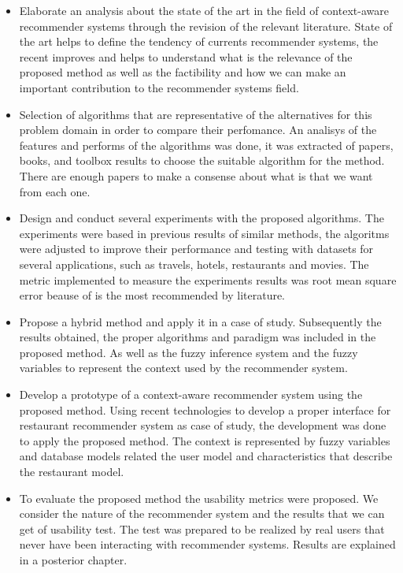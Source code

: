 \begin{itemize}  
\item Elaborate an analysis about the state of the art in the field
of context-aware recommender systems through  the revision of 
the relevant literature. State of the art helps to define the tendency
of currents recommender systems, the recent improves and helps to understand
what is the relevance of the proposed method as well as the factibility and 
how we can make an important contribution to the recommender systems field.
\item Selection of algorithms that are representative of the alternatives for
this problem domain in order to compare their perfomance. An analisys of the 
features and performs of the algorithms was done, it was extracted of papers,
books, and toolbox results to choose the suitable algorithm
for the method. There are enough papers to make a consense about 
what is that we want from each one. 
\item Design and conduct several experiments with the proposed 
algorithms. The experiments were based in previous results of similar 
methods, the algoritms were adjusted to improve their performance and 
testing with datasets for several applications, such as travels, hotels, 
restaurants and movies. The  metric implemented to measure the experiments 
results was root mean square error beause of is the most recommended 
by literature.
\item Propose a hybrid method and apply it in a case of study. 
Subsequently the results obtained, the proper algorithms and paradigm was 
included in the proposed method. As well as the fuzzy inference system and 
the fuzzy variables to represent the context used by the 
recommender system.
\item Develop a prototype of a context-aware recommender system 
using the proposed method. Using recent technologies to develop a proper 
interface for restaurant recommender system as case of study, 
the development was done to apply the proposed method. The 
context is represented by fuzzy variables and database models 
related the user model and characteristics
that describe the restaurant model.
\item To evaluate the proposed method the usability metrics were proposed. 
We consider the nature of the recommender system and the results 
that we can get of usability test. The test was prepared to be realized
by real users that never have been interacting with recommender systems. 
Results are explained in a posterior chapter.
\end{itemize} 

